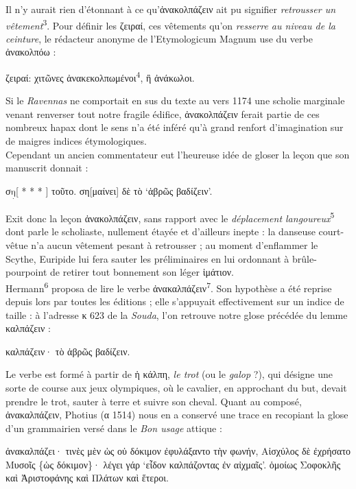 \documentclass[12pt]{book}%
\newcommand{\italique}[1]{\textit{#1}}%
\newcommand{\citComm}[1]{\begin{quoting}[vskip=0pt] #1 \end{quoting}}%
\newcommand{\latin}[1]{{\policeLat #1}}%
\newcommand{\douteux}[1]{$\underset{\cdot}{\text{#1}}$}
\newcommand{\marqueur}[1]{\textsuperscript{#1}}%
\newenvironment{groupe}{%
\pstart%
\ledgroup%
}{%
\pend %
}%
\begin{document}
\begin{pages}
\begin{Leftside}
\begin{groupe}
{{Il n'y aurait rien d'étonnant à ce qu'ἀνακολπάζειν ait pu signifier \italique{retrousser un vêtement}\marqueur{3}.
Pour définir les ζειραί, ces vêtements qu'on \italique{resserre au niveau de la ceinture}, le rédacteur anonyme de l'\latin{Etymologicum Magnum} use du verbe ἀνακολπόω :%
\citComm{ζειραί: χιτῶνες ἀνακεκολπωμένοι\marqueur{4}, ἢ ἀνάκωλοι.}%
Si le \italique{Ravennas} ne comportait en sus du texte au vers 1174 une scholie marginale venant renverser tout notre fragile édifice, ἀνακολπάζειν ferait partie de ces nombreux hapax dont le sens n'a été inféré qu'à grand renfort d'imagination sur de maigres indices étymologiques.\\
Cependant un ancien commentateur eut l'heureuse idée de gloser la leçon que son manuscrit donnait :%
\citComm{σ\douteux{η}[ * * * ] τοῦτο. ση[μαίνει] δὲ τὸ `ἁβρῶς βαδίζειν'.}%
Exit donc la leçon ἀνακολπάζειν, sans rapport avec le \italique{déplacement langoureux}\marqueur{5} dont parle le scholiaste, nullement étayée et d'ailleurs inepte : la danseuse court-vêtue n'a aucun vêtement pesant à retrousser ; au moment d'enflammer le Scythe, Euripide lui fera sauter les préliminaires en lui ordonnant à brûle-pourpoint de retirer tout bonnement son léger ἱμάτιον.\\
Hermann\marqueur{6} proposa de lire le verbe ἀνακαλπάζειν\marqueur{7}. 
Son hypothèse a été reprise depuis lors par toutes les éditions ; elle s'appuyait effectivement sur un indice de taille : à l'adresse κ 623 de la \italique{Souda}, l'on retrouve notre glose précédée du lemme καλπάζειν :%
\citComm{καλπάζειν· τὸ ἁβρῶς βαδίζειν.}%
Le verbe est formé à partir de ἡ κάλπη, \italique{le trot} (ou le \italique{galop} ?), qui désigne une sorte de course aux jeux olympiques, où le cavalier, en approchant du but, devait prendre le trot, sauter à terre et suivre son cheval.
Quant au composé, ἀνακαλπάζειν, Photius (α 1514) nous en a conservé une trace en recopiant la glose d'un grammairien versé dans le \italique{Bon usage} attique :%
\citComm{ἀνακαλπάζει· τινὲς μὲν ὡς οὐ δόκιμον ἐφυλάξαντο τὴν φωνήν, Αἰσχύλος δὲ ἐχρήσατο Μυσοῖς \{ὡς δόκιμον\}· λέγει γάρ `εἶδον καλπάζοντας ἐν αἰχμαῖς'. ὁμοίως Σοφοκλῆς καὶ Ἀριστοφάνης καὶ Πλάτων καὶ ἕτεροι.\\
}}}
\end{groupe}
\end{Leftside}
\end{pages}
\end{document}
